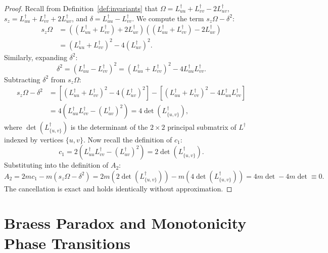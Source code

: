 \documentclass[11pt,a4paper]{article}
\theoremstyle{plain}
\theoremstyle{definition}
\begin{document}
\begin{proof}
Recall from Definition~\ref{def:invariants} that $\Omega = L^\dagger_{uu} + L^\dagger_{vv} - 2 L^\dagger_{uv}$, $s_z = L^\dagger_{uu} + L^\dagger_{vv} + 2 L^\dagger_{uv}$, and $\delta = L^\dagger_{uu} - L^\dagger_{vv}$. We compute the term $s_z \Omega - \delta^2$:
\begin{align}
    s_z \Omega &= \left( (L^\dagger_{uu} + L^\dagger_{vv}) + 2 L^\dagger_{uv} \right) \left( (L^\dagger_{uu} + L^\dagger_{vv}) - 2 L^\dagger_{uv} \right) \nonumber \\
    &= (L^\dagger_{uu} + L^\dagger_{vv})^2 - 4 (L^\dagger_{uv})^2.
\end{align}
Similarly, expanding $\delta^2$:
\begin{equation}
    \delta^2 = (L^\dagger_{uu} - L^\dagger_{vv})^2 = (L^\dagger_{uu} + L^\dagger_{vv})^2 - 4 L^\dagger_{uu} L^\dagger_{vv}.
\end{equation}
Subtracting $\delta^2$ from $s_z \Omega$:
\begin{align}
    s_z \Omega - \delta^2 &= \left[ (L^\dagger_{uu} + L^\dagger_{vv})^2 - 4 (L^\dagger_{uv})^2 \right] - \left[ (L^\dagger_{uu} + L^\dagger_{vv})^2 - 4 L^\dagger_{uu} L^\dagger_{vv} \right] \nonumber \\
    &= 4 \left( L^\dagger_{uu} L^\dagger_{vv} - (L^\dagger_{uv})^2 \right) = 4 \det(L^\dagger_{\{u, v\}}),
\end{align}
where $\det(L^\dagger_{\{u, v\}})$ is the determinant of the $2 \times 2$ principal submatrix of $L^\dagger$ indexed by vertices $\{u, v\}$.
Now recall the definition of $c_1$:
\begin{equation}
    c_1 = 2 \left( L^\dagger_{uu} L^\dagger_{vv} - (L^\dagger_{uv})^2 \right) = 2 \det(L^\dagger_{\{u, v\}}).
\end{equation}
Substituting into the definition of $A_2$:
\begin{equation}
    A_2 = 2m c_1 - m (s_z \Omega - \delta^2) = 2m \left( 2 \det(L^\dagger_{\{u, v\}}) \right) - m \left( 4 \det(L^\dagger_{\{u, v\}}) \right) = 4m \det - 4m \det \equiv 0.
\end{equation}
The cancellation is exact and holds identically without approximation.
\end{proof}

\section{Braess Paradox and Monotonicity Phase Transitions}
\label{sec:braess_transitions}
\end{document}
